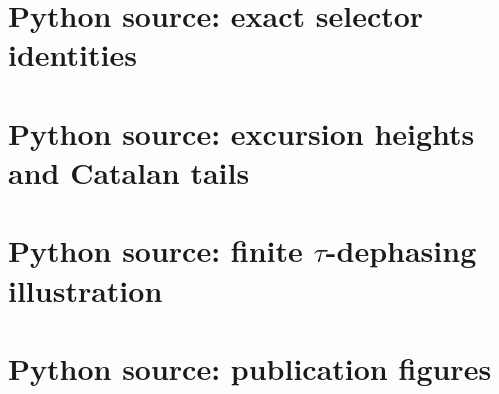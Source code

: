 \documentclass[11pt]{amsart}
\numberwithin{equation}{section}
\theoremstyle{plain}
\theoremstyle{definition}
\theoremstyle{remark}
\begin{document}
\section{Python source: exact selector identities}


\section{Python source: excursion heights and Catalan tails}


\section{Python source: finite $\tau$-dephasing illustration}


\section{Python source: publication figures}

\end{document}

